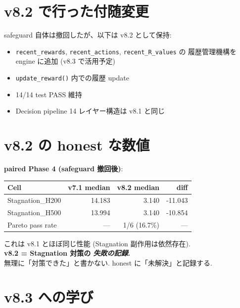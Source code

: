 \documentclass[a4paper,11pt]{report}
\begin{document}
\section{v8.2 で行った付随変更}

safeguard 自体は撤回したが、以下は v8.2 として保持:

\begin{itemize}[leftmargin=*]
  \item \texttt{recent\_rewards}, \texttt{recent\_actions}, \texttt{recent\_R\_values} の
        履歴管理機構を engine に追加 (v8.3 で活用予定)
  \item \texttt{update\_reward()} 内での履歴 update
  \item 14/14 test PASS 維持
  \item Decision pipeline 14 レイヤー構造は v8.1 と同じ
\end{itemize}

\section{v8.2 の honest な数値}

\textbf{paired Phase 4 (safeguard 撤回後)}:

\begin{tabular}{l r r r}
\toprule
Cell & v7.1 median & v8.2 median & diff \\
\midrule
Stagnation\_H200 & 14.183 & 3.140 & \textcolor{warning}{-11.043} \\
Stagnation\_H500 & 13.994 & 3.140 & \textcolor{warning}{-10.854} \\
Pareto pass rate & — & 1/6 (16.7\%) & — \\
\bottomrule
\end{tabular}

これは v8.1 とほぼ同じ性能 (Stagnation 副作用は依然存在).\\
\textbf{v8.2 = Stagnation 対策の \emph{失敗の記録}.}\\
無理に「対策できた」と書かない. honest に「未解決」と記録する.

\section{v8.3 への学び}
\end{document}
